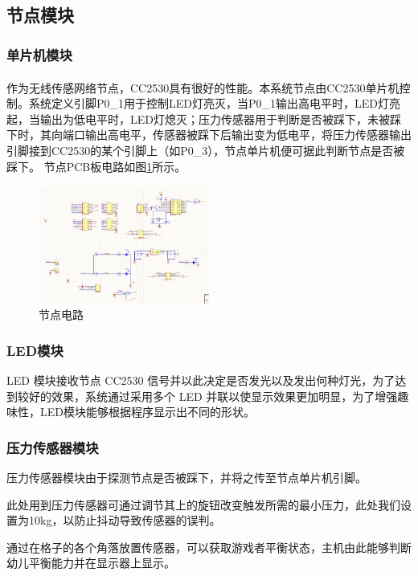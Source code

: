 \documentclass[a4paper,11pt,onecolumn,twoside]{article}
\newcommand{\supercite}[1]{\textsuperscript{\cite{#1}}}
\begin{document}
\begin{spacing}{1.2}
\subsection{节点模块}
    \subsubsection{单片机模块}
    作为无线传感网络节点，CC2530具有很好的性能\supercite{15}。本系统节点由CC2530单片机控制。系统定义引脚P0\_1用于控制LED灯亮灭，当P0\_1输出高电平时，LED灯亮起，当输出为低电平时，LED灯熄灭；压力传感器用于判断是否被踩下，未被踩下时，其向端口输出高电平，传感器被踩下后输出变为低电平，将压力传感器输出引脚接到CC2530的某个引脚上（如P0\_3），节点单片机便可据此判断节点是否被踩下。
    节点PCB板电路如图\ref{fig:pcb}所示。

\begin{figure}[htb]
    \centering
    {\includegraphics [width=0.5\textwidth]{./image/pcb2.png}
    \caption{节点电路}
    \label{fig:pcb}}
\end{figure}

    \subsubsection{LED模块}
    LED 模块接收节点 CC2530 信号并以此决定是否发光以及发出何种灯光，为了达到较好的效果，系统通过采用多个 LED 并联以使显示效果更加明显，为了增强趣味性，LED模块能够根据程序显示出不同的形状。

    \subsubsection{压力传感器模块}
    压力传感器模块由于探测节点是否被踩下，并将之传至节点单片机引脚。

    此处用到压力传感器可通过调节其上的旋钮改变触发所需的最小压力，此处我们设置为10kg，以防止抖动导致传感器的误判。

    通过在格子的各个角落放置传感器，可以获取游戏者平衡状态，主机由此能够判断幼儿平衡能力并在显示器上显示。



\end{spacing}
\end{document}

